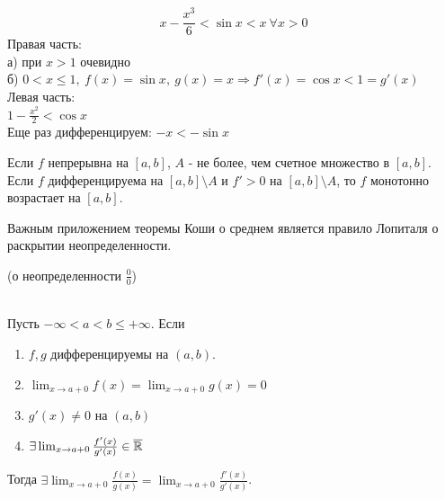 \begin{example}
    \[x-\frac{x^3}{6} < \sin x < x \ \forall x > 0\]
    Правая часть:\\
    а) при $x > 1$ очевидно \\
    б) $0 < x \leq 1, \ f(x) = \sin x, \ g(x) = x \Rightarrow f'(x) = \cos x < 1 = g'(x)$ \\
    Левая часть: \\
    $1-\frac{x^2}{2} < \cos x$\\
    Еще раз дифференцируем:
    $-x < -\sin x$\\
\end{example}

\begin{problem}
    Если $f$ непрерывна на $[a, b]$, $A$ - не более, чем счетное множество в $[a, b]$.
    Если $f$ дифференцируема на $[a, b] \setminus A$ и $f' > 0$ на $[a, b] \setminus A$, то $f$ монотонно возрастает на $[a, b]$.
\end{problem}

Важным приложением теоремы Коши о среднем является правило Лопиталя о раскрытии неопределенности.

\begin{theorem}\hypertarget{zero_on_zero_th}{(о неопределенности $\frac{0}{0}$)}\\
    Пусть $-\infty < a < b \leq +\infty$. Если
    \begin{enumerate}
        \item $f, g$ дифференцируемы на $(a, b)$.
        \item $\lim_{x \to a+0} f(x) = \lim_{x \to a+0} g(x) = 0$
        \item $g'(x) \neq 0$ на $(a, b)$
        \item $\exists \lim_{x \to a+0} \frac{f'(x)}{g'(x)} \in \overline{\mathbb{R}}$
    \end{enumerate}
    Тогда $\exists \lim_{x \to a+0} \frac{f(x)}{g(x)} = \lim_{x \to a+0} \frac{f'(x)}{g'(x)}$.
\end{theorem}

